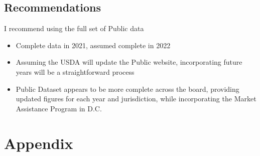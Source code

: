 \documentclass{article}
\begin{document}
\subsection*{Recommendations}
I recommend using the full set of Public data
\begin{itemize}
    \item Complete data in 2021, assumed complete in 2022
    \item Assuming the USDA will update the Public website, incorporating future years will be a straightforward process 
    \item Public Dataset appears to be more complete across the board, providing updated figures for each year and jurisdiction, while incorporating the Market Assistance Program in D.C. 
\end{itemize}

\newpage 
\section*{Appendix}

\end{document}
